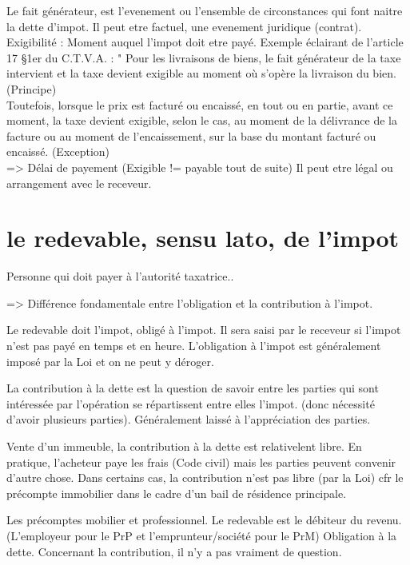 \documentclass{book}
\begin{document}
Le fait générateur, est l'evenement ou l'ensemble de circonstances qui font naitre la dette d'impot. Il peut etre factuel, une evenement juridique (contrat).\\

Exigibilité : Moment auquel l'impot doit etre payé. Exemple éclairant de l'article 17 §1er du C.T.V.A. : " Pour les livraisons de biens, le fait générateur de la taxe intervient et la taxe devient exigible au moment où s'opère la livraison du bien. (Principe) \\

Toutefois, lorsque le prix est facturé ou encaissé, en tout ou en partie, avant ce moment, la taxe devient exigible, selon le cas, au moment de la délivrance de la facture ou au moment de l'encaissement, sur la base du montant facturé ou encaissé. (Exception)\\

=> Délai de payement (Exigible != payable tout de suite) Il peut etre légal ou arrangement avec le receveur.

\section{le redevable, sensu lato, de l'impot}

Personne qui doit payer à l'autorité taxatrice..

=> Différence fondamentale entre l'obligation et la contribution à l'impot.

Le redevable doit l'impot, obligé à l'impot. Il sera saisi par le receveur si l'impot n'est pas payé en temps et en heure. L'obligation à l'impot est généralement imposé par la Loi et on ne peut y déroger.

La contribution à la dette est la question de savoir entre les parties qui sont intéressée par l'opération se répartissent entre elles l'impot.  (donc nécessité d'avoir plusieurs parties). Généralement laissé à l'appréciation des parties.

Vente d'un immeuble, la contribution à la dette est relativelent libre. En pratique, l'acheteur paye les frais (Code civil) mais les parties peuvent convenir d'autre chose. Dans certains cas, la contribution n'est pas libre (par la Loi) cfr le précompte immobilier dans le cadre d'un bail de résidence principale.

Les précomptes mobilier et professionnel. Le redevable est le débiteur du revenu. (L'employeur pour le PrP et l'emprunteur/société pour le PrM) Obligation à la dette. Concernant la contribution, il n'y a pas vraiment de question.
\end{document}
